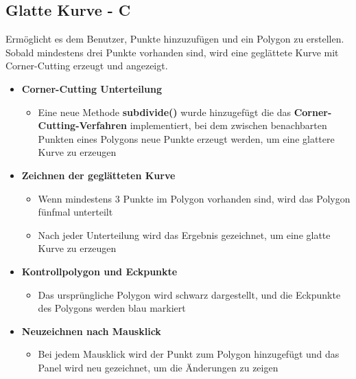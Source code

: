 \subsection*{Glatte Kurve - C}
Ermöglicht es dem Benutzer, Punkte hinzuzufügen und ein Polygon zu erstellen. Sobald mindestens drei Punkte vorhanden sind, wird eine geglättete Kurve mit Corner-Cutting erzeugt und angezeigt.
\begin{itemize}[itemsep=0pt]
   \item \textbf{Corner-Cutting Unterteilung}
   \begin{itemize}
    \item Eine neue Methode \textbf{subdivide()} wurde hinzugefügt die  das \textbf{Corner-Cutting-Verfahren} implementiert, bei dem zwischen benachbarten Punkten eines Polygons neue Punkte erzeugt werden, um eine glattere Kurve zu erzeugen
   \end{itemize}
   \item \textbf{Zeichnen der geglätteten Kurve} 
   \begin{itemize}
    \item Wenn mindestens 3 Punkte im Polygon vorhanden sind, wird das Polygon fünfmal unterteilt
    \item Nach jeder Unterteilung wird das Ergebnis gezeichnet, um eine glatte Kurve zu erzeugen
   \end{itemize}
   \item \textbf{Kontrollpolygon und Eckpunkte}
   \begin{itemize}
    \item Das ursprüngliche Polygon wird schwarz dargestellt, und die Eckpunkte des Polygons werden blau markiert
   \end{itemize}
   \item \textbf{Neuzeichnen nach Mausklick}
   \begin{itemize}
    \item Bei jedem Mausklick wird der Punkt zum Polygon hinzugefügt und das Panel wird neu gezeichnet, um die Änderungen zu zeigen
   \end{itemize}
\end{itemize}
\begin{codeblock}
    
\end{codeblock}

